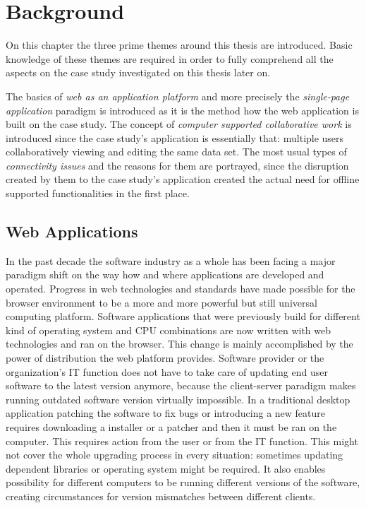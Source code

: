 \chapter{Background}

On this chapter the three prime themes around this thesis are introduced. Basic knowledge of these themes are required in order to fully comprehend all the aspects on the case study investigated on this thesis later on. 

The basics of \textit{web as an application platform} and more precisely the \textit{single-page application} paradigm is introduced as it is the method how the web application is built on the case study. The concept of \textit{computer supported collaborative work} is introduced since the case study's application is essentially that: multiple users collaboratively viewing and editing the same data set. The most usual types of \textit{connectivity issues} and the reasons for them are portrayed, since the disruption created by them to the case study's application created the actual need for offline supported functionalities in the first place. 




\section{Web Applications}

In the past decade the software industry as a whole has been facing a major paradigm shift on the way how and where applications are developed and operated. Progress in web technologies and standards have made possible for the browser environment to be a more and more powerful but still universal computing platform. Software applications that were previously build for different kind of operating system and CPU combinations are now written with web technologies and ran on the browser. This change is mainly accomplished by the power of distribution the web platform provides. Software provider or the organization's IT function does not have to take care of updating end user software to the latest version anymore, because the client-server paradigm\cite{berson_client-server_1992} makes running outdated software version virtually impossible. In a traditional desktop application patching the software to fix bugs or introducing a new feature requires downloading a installer or a patcher and then it must be ran on the computer. This requires action from the user or from the IT function. This might not cover the whole upgrading process in every situation: sometimes updating dependent libraries or operating system might be required. It also enables possibility for different computers to be running different versions of the software, creating circumstances for version mismatches between different clients. \cite{jazayeri_trends_????} \cite{taivalsaari_mashware:_2009} %

